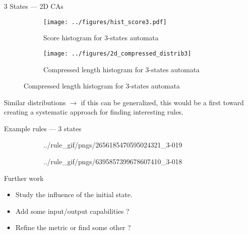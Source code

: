 \documentclass[xcolor=dvipsnames]{beamer}
\begin{document}
\begin{frame}{3 States --- 2D CAs}
  \begin{figure}[htbp]
    \centering
    \begin{subfigure}{.49\linewidth}
      \centering
      \texttt{[image: ../figures/hist\_score3.pdf]}
      \caption{Score histogram for 3-states automata}
    \end{subfigure}
    \begin{subfigure}{.49\linewidth}
      \centering
      \texttt{[image: ../figures/2d\_compressed\_distrib3]}
      \caption{Compressed length histogram for 3-states automata}
    \end{subfigure}
  \end{figure}

  Similar distributions $\rightarrow$ if this can be generalized, this would be
  a first toward creating a systematic approach for finding interesting rules.
\end{frame}

\begin{frame}{Example rules --- 3 states}
  \begin{figure}[htbp]
    \centering
    \begin{subfigure}{.49\linewidth}
      \centering
      {../rule_gif/pngs/2656185470595024321_3-}{0}{19}
    \end{subfigure}
    \begin{subfigure}{.49\linewidth}
      \centering
      {../rule_gif/pngs/6395857399678607410_3-}{0}{18}
    \end{subfigure}
  \end{figure}
\end{frame}

\begin{frame}{Further work}
  \begin{itemize}
    \item Study the influence of the initial state.
    \item Add some input/output capabilities ?
    \item Refine the metric or find some other ?
  \end{itemize}

\end{frame}
\end{document}
